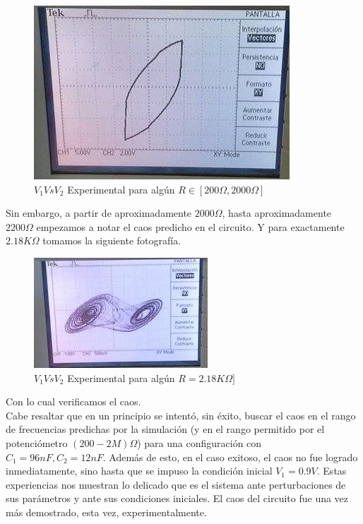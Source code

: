 \documentclass[%
 reprint,
 amsmath,amssymb,
 aps,
]{revtex4-1}
\begin{document}
\begin{figure}
\centering
\includegraphics[width=0.7\linewidth]{"experimento1"}
\caption{$V_1 Vs V_2$ Experimental para algún $R \in [200\Omega,2000\Omega]$}
\label{fig:experimento1}
\end{figure}

Sin embargo, a partir de aproximadamente $2000\Omega$, hasta  aproximadamente $2200\Omega$ empezamos a notar el caos predicho en el circuito. Y para exactamente $2.18K\Omega$ tomamos la siguiente fotografía.\\

\begin{figure}
\centering
\includegraphics[width=0.7\linewidth]{"experimento2"}
\caption{$V_1 Vs V_2$ Experimental para algún $R =2.18K\Omega]$}
\label{fig:experimento2}
\end{figure}

Con lo cual verificamos el caos.\\

Cabe resaltar que en un principio se intentó, sin éxito, buscar el caos en el rango de frecuencias predichas por la simulación (y en el rango permitido por el potenciómetro $(200-2M)\Omega$) para una configuración con $C_1 = 96nF, C_2 = 12nF$. Además de esto, en el caso exitoso, el caos no fue logrado inmediatamente, sino hasta que se impuso la condición inicial $V_1 = 0.9V$. Estas experiencias nos muestran lo delicado que es el sistema ante perturbaciones de sus parámetros y ante sus condiciones iniciales. El caos del circuito fue una vez más demostrado, esta vez, experimentalmente.\\
\end{document}
